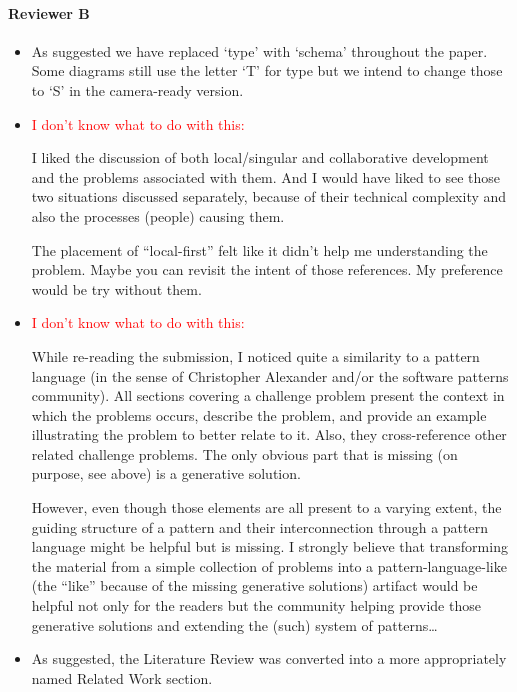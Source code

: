 \documentclass{article}
\begin{document}
\paragraph{Reviewer B}{}
\begin{itemize}

  \item As suggested we have replaced `type' with `schema' throughout the paper. Some diagrams still use the letter `T' for type but we intend to change those to `S' in the camera-ready version.

  \item \textcolor{red}{I don't know what to do with this:}
\begin{displayquote}
I liked the discussion of both local/singular and collaborative development and the problems associated with them. And I would have liked to see those two situations discussed separately, because of their technical complexity and also the processes (people) causing them.

The placement of “local-first” felt like it didn’t help me understanding the problem. Maybe you can revisit the intent of those references. My preference would be try without them.
\end{displayquote}

\item \textcolor{red}{I don't know what to do with this:}
\begin{displayquote}
  While re-reading the submission, I noticed quite a similarity to a pattern language (in the sense of Christopher Alexander and/or the software patterns community). All sections covering a challenge problem present the context in which the problems occurs, describe the problem, and provide an example illustrating the problem to better relate to it. Also, they cross-reference other related challenge problems. The only obvious part that is missing (on purpose, see above) is a generative solution.

  However, even though those elements are all present to a varying extent, the guiding structure of a pattern and their interconnection through a pattern language might be helpful but is missing. I strongly believe that transforming the material from a simple collection of problems into a pattern-language-like (the “like” because of the missing generative solutions) artifact would be helpful not only for the readers but the community helping provide those generative solutions and extending the (such) system of patterns…
\end{displayquote}

\item As suggested, the Literature Review was converted into a more appropriately named Related Work section.
\end{itemize}
\end{document}
